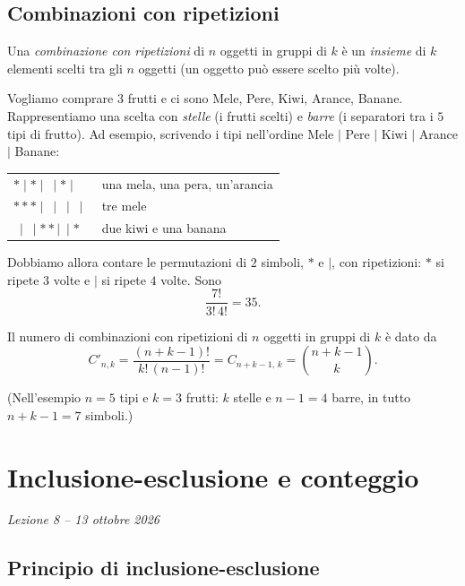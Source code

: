 \documentclass[11pt,a4paper]{article}
\begin{document}
\subsection{Combinazioni con ripetizioni}

\begin{definizione}
Una \emph{combinazione con ripetizioni} di $n$ oggetti in gruppi di $k$ è un \emph{insieme} di $k$ elementi scelti tra gli $n$ oggetti (un oggetto può essere scelto più volte).
\end{definizione}

\begin{esempio}[Frutta]
Vogliamo comprare $3$ frutti e ci sono Mele, Pere, Kiwi, Arance, Banane. Rappresentiamo una scelta con \emph{stelle} (i frutti scelti) e \emph{barre} (i separatori tra i $5$ tipi di frutto). Ad esempio, scrivendo i tipi nell'ordine Mele $|$ Pere $|$ Kiwi $|$ Arance $|$ Banane:
\begin{center}
\begin{tabular}{@{}ll@{}}
$\ast \mid \ast \mid\ \mid \ast \mid\ $ & una mela, una pera, un'arancia \\
$\ast\ast\ast \mid\ \mid\ \mid\ \mid\ $ & tre mele \\
$\ \mid\ \mid \ast\ast \mid\ \mid \ast$ & due kiwi e una banana
\end{tabular}
\end{center}
Dobbiamo allora contare le permutazioni di $2$ simboli, $\ast$ e $\mid$, con ripetizioni: $\ast$ si ripete $3$ volte e $\mid$ si ripete $4$ volte. Sono
\[
\frac{7!}{3!\,4!} = 35 .
\]
\end{esempio}

\begin{proposizione}
Il numero di combinazioni con ripetizioni di $n$ oggetti in gruppi di $k$ è dato da
\[
C'_{n,k} = \frac{(n+k-1)!}{k!\,(n-1)!} = C_{n+k-1,\,k} = \binom{n+k-1}{k} .
\]
\end{proposizione}

(Nell'esempio $n = 5$ tipi e $k = 3$ frutti: $k$ stelle e $n - 1 = 4$ barre, in tutto $n + k - 1 = 7$ simboli.)

\section[Inclusione-esclusione e conteggio (Lezione 8 -- 13 ottobre 2026)]{Inclusione-esclusione e conteggio}
\noindent\emph{Lezione 8 -- 13 ottobre 2026}
\subsection{Principio di inclusione-esclusione}
\end{document}
